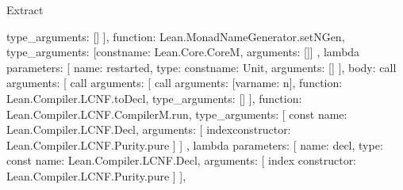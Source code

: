 \begin{lexlean}{Extract}
\begin{toolingmodule}
{{{{{{{{{{{{{{{                                          type_arguments: []
                                        }
                                      ],
                                      function: Lean.MonadNameGenerator.setNGen,
                                      type_arguments: [const{name: Lean.Core.CoreM, arguments: []}]
                                    },
                                    lambda{
                                      parameters: [
                                        {name: restarted, type: const{name: Unit, arguments: []}}
                                      ],
                                      body: call{
                                        arguments: [
                                          call{
                                            arguments: [
                                              call{
                                                arguments: [var{name: n}],
                                                function: Lean.Compiler.LCNF.toDecl,
                                                type_arguments: []
                                              }
                                            ],
                                            function: Lean.Compiler.LCNF.CompilerM.run,
                                            type_arguments: [
                                              const{
                                                name: Lean.Compiler.LCNF.Decl,
                                                arguments: [
                                                  index{constructor: Lean.Compiler.LCNF.Purity.pure}
                                                ]
                                              }
                                            ]
                                          },
                                          lambda{
                                            parameters: [
                                              {
                                                name: decl,
                                                type: const{
                                                  name: Lean.Compiler.LCNF.Decl,
                                                  arguments: [
                                                    index{
                                                      constructor: Lean.Compiler.LCNF.Purity.pure
                                                    }
                                                  ]
                                                }
                                              }
                                            ],
}}}}}}}}}}}}}}}}
\end{toolingmodule}
\end{lexlean}
